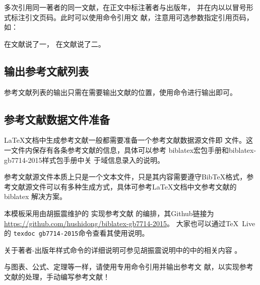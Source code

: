 多次引用同一著者的同一文献，在正文中标注著者与出版年，
并在\qtmark{()}内以以冒号形式标注引文页码。此时可以使用命令引用文
献，注意用可选参数指定引用页码，如：

\begin{center}
  \begin{minipage}[h]{0.9\linewidth}    
    \begin{texdemov}%
      在文献\parencite[20-22]{程根伟1999-32-36}说了一， 在文献\parencite[55-60]{程根伟1999-32-36}说了二。%
    \end{texdemov}
  \end{minipage}
\end{center}

\subsection{输出参考文献列表}

参考文献列表的输出只需在需要输出文献的位置，使用命令进行输出即可。

\subsection{参考文献数据文件准备}

\LaTeX 文档中生成参考文献一般都需要准备一个参考文献数据源文件即
文件。这一文件内保存有各条参考文献的信息，具体可以参考
biblatex宏包手册和biblatex-gb7714-2015样式包手册\cite{胡振震2019}中关
于域信息录入的说明。

参考文献源文件本质上只是一个文本文件，只是其内容需要遵守BibTeX格式，参
考文献源文件可以有多种生成方式，具体可参考\LaTeX{}文档中文参考文献的
biblatex 解决方案\parencite[2.2节]{胡振震2016}。


本模板采用由胡振震维护的
实现参考文献
的编排\cite{胡振震2019}，其Github链接为
\url{https://github.com/hushidong/biblatex-gb7714-2015}。
大家也可以通过\TeX~Live的 \verb|texdoc gb7714-2015|命令查看其使用说明。

关于著者-出版年样式命令的详细说明可参见胡振震说明中的中的相关内容
\parencite[2.2、2.3节]{胡振震2016}。

与图表、公式、定理等一样，请使用专用命令引用并输出参考文
献，以实现参考文献的处理，手动编写参考文献！


